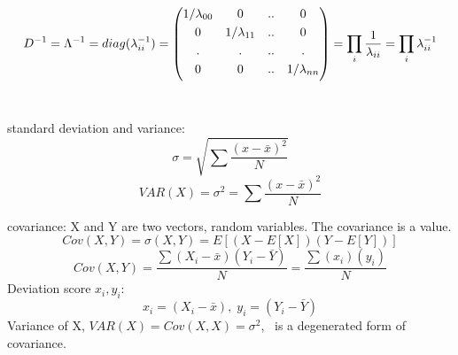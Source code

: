\documentclass[a4paper,12pt]{article}
\begin{document}
\begin{compactitem}
\begin{equation}
\label{eq:pdpD}
D^{-1}=\Lambda^{-1}=diag(\lambda_{ii}^{-1})=
\begin{pmatrix}
       1/\lambda_{00}& 0 				& ..	&	0 	\\[0.3em]
       0 			& 1/\lambda_{11} & ..		&	0 	\\[0.3em]
       .			& .				& ..	&	.	\\[0.3em]
       0 			& 0 			& ..	&	1/\lambda_{nn}\\[0.3em]
\end{pmatrix}
=\prod_{i}^{} \frac{1}{\lambda_{ii} }\\
=\prod_{i}^{} \lambda_{ii}^{-1} \\
\end{equation}\\

\item standard deviation and variance:
\begin{equation}
\label{eq:std}
\sigma = \sqrt {\sum \frac{(x-\bar{x})^2}{N}}
\end{equation}
\begin{equation}
\label{eq:variance}
VAR(X)=\sigma^{2} = {\sum \frac{(x-\bar{x})^2}{N}}
\end{equation}

\item covariance: X and Y are two vectors, random variables. The covariance is a value.
\begin{equation}
\label{eq:covar}
Cov(X,Y)=\sigma(X,Y)=E[(X - E[X])(Y-E[Y])]
\end{equation}
\begin{equation}
\label{eq:covar1}
Cov(X,Y)=\frac{\sum(X_i-\bar{x})(Y_i-\bar{Y})}{N}=
\frac{\sum(x_i)(y_i)}{N}
\end{equation}
Deviation score $x_i, y_i$:
\begin{equation}
\label{eq:covar1}
x_{i}=(X_i-\bar{x}),\;
y_{i}=(Y_i-\bar{Y})
\end{equation}
Variance of X, $VAR(X)=Cov(X,X)=\sigma^{2}$, \ is a degenerated form of covariance.\\


\end{compactitem}
\end{document}
